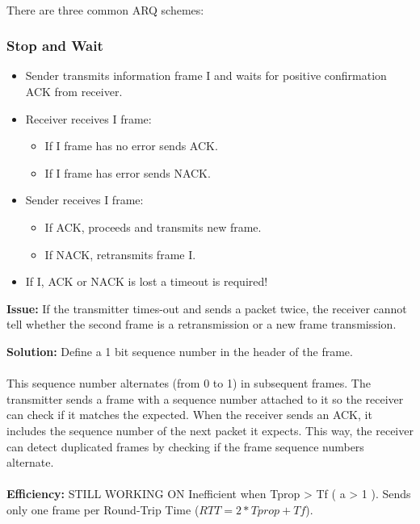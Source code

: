 \documentclass[../resumosRCOM.tex]{subfiles}
\begin{document}
\paragraph{}
There are three common ARQ schemes:

\subsubsection{Stop and Wait}
\begin{itemize}
    \item  Sender transmits information frame I and waits for positive confirmation
    ACK from receiver.
    \item Receiver receives I frame:
    \begin{itemize}
        \item If I frame has no error sends ACK.
        \item If I frame has error sends NACK.
    \end{itemize}
    \item Sender receives I frame:
    \begin{itemize}
        \item If ACK, proceeds and transmits new frame.
        \item If NACK, retransmits frame I.
    \end{itemize} 
    \item If I, ACK or NACK is lost a timeout is required!
\end{itemize}

\textbf{Issue:}
If the transmitter times-out and sends a packet twice, the receiver cannot tell whether
the second frame is a retransmission or a new frame transmission.

\textbf{Solution:}
Define a 1 bit sequence number in the header of the frame.

\paragraph{}
This sequence number alternates (from 0 to 1) in subsequent frames. The transmitter sends
a frame with a sequence number attached to it so the receiver can check if it matches the 
expected.  When the receiver sends an ACK, it includes the sequence number of the next 
packet it expects.  This way, the receiver can detect duplicated frames by checking if the
frame sequence numbers alternate.

\paragraph{}
\textbf{Efficiency:}
STILL WORKING ON
Inefficient when Tprop > Tf ( a > 1 ). Sends only one frame per Round-Trip Time 
($RTT = 2*Tprop+Tf$).
\end{document}
